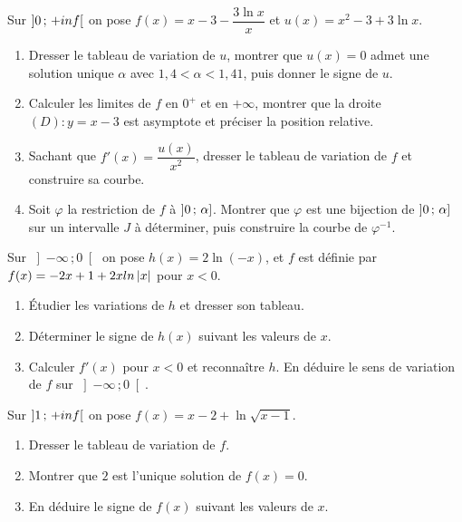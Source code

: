 \begin{annales}
Sur $\left]0\,;\,+inf\right[$ on pose $f(x) = x-3-\dfrac{3\ln x}{x}$ et
$u(x) = x^{2}-3+3\ln x$.
\begin{enumerate}[label=\textbf{\arabic*)}, leftmargin=*, itemsep=0.15em]
  \item Dresser le tableau de variation de $u$, montrer que $u(x) = 0$ admet
        une solution unique $\alpha$ avec $1{,}4 < \alpha < 1{,}41$, puis
        donner le signe de $u$.
  \item Calculer les limites de $f$ en $0^{+}$ et en $+\infty$, montrer que la
        droite $(D) : y = x-3$ est asymptote et préciser la position relative.
  \item Sachant que $f'(x) = \dfrac{u(x)}{x^{2}}$, dresser le tableau de
        variation de $f$ et construire sa courbe.
  \item Soit $\varphi$ la restriction de $f$ à $\left]0\,;\,\alpha\right]$.
        Montrer que $\varphi$ est une bijection de $\left]0\,;\,\alpha\right]$
        sur un intervalle $J$ à déterminer, puis construire la courbe de
        $\varphi^{-1}$.
\end{enumerate}

Sur $\left]-\infty\,;0\right[$ on pose $h(x) = 2\ln(-x)$, et $f$ est définie
par $f(x) = -2x+1+2xln\left|x\right|$ pour $x<0$.
\begin{enumerate}[label=\textbf{\alph*)}, leftmargin=*, itemsep=0.15em]
  \item Étudier les variations de $h$ et dresser son tableau.
  \item Déterminer le signe de $h(x)$ suivant les valeurs de $x$.
  \item Calculer $f'(x)$ pour $x<0$ et reconnaître $h$. En déduire le sens de
        variation de $f$ sur $\left]-\infty\,;0\right[$.
\end{enumerate}

Sur $\left]1\,;\,+inf\right[$ on pose $f(x) = x-2+\ln\sqrt{x-1}$.
\begin{enumerate}[label=\textbf{\alph*)}, leftmargin=*, itemsep=0.15em]
  \item Dresser le tableau de variation de $f$.
  \item Montrer que $2$ est l'unique solution de $f(x) = 0$.
  \item En déduire le signe de $f(x)$ suivant les valeurs de $x$.
\end{enumerate}


\end{annales}
